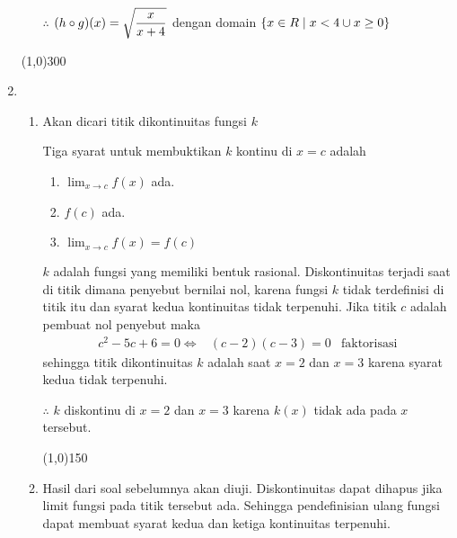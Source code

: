 \begin{enumerate}[leftmargin=*, label={\arabic*}.]
\begin{enumerate}[label={\alph*}.]
    $\therefore$ $\ds (h \circ g)(x) = \sqrt{\frac{x}{x+4}}$ dengan domain 
    $\set*{x \in R \mid x < 4 \cup x \geq 0}$ 
    
    \end{enumerate}

\begin{center}\line(1,0){300}\end{center}


\item
    \begin{enumerate}[label={\alph*}.]
    \item Akan dicari titik dikontinuitas fungsi $k$
    
    Tiga syarat untuk membuktikan $k$ kontinu di $x=c$ adalah
        \begin{enumerate}[label={\arabic*}.]
        \item $\lim_{x\to c} f(x)$ ada.
        \item $f(c)$ ada.
        \item $\lim_{x\to c} f(x) = f(c)$
        \end{enumerate}
    $k$ adalah fungsi yang memiliki bentuk rasional. Diskontinuitas terjadi saat 
    di titik dimana penyebut bernilai nol, karena fungsi $k$ tidak terdefinisi 
    di titik itu dan syarat kedua kontinuitas tidak terpenuhi.
    Jika titik $c$ adalah pembuat nol penyebut maka
    \begin{align*}
        c^{2} - 5c + 6 = 0
        \iff &(c-2)(c-3) = 0
        &\text{faktorisasi}
    \end{align*}
    sehingga titik dikontinuitas $k$ adalah saat $x=2$ dan $x=3$ karena syarat kedua 
    tidak terpenuhi.

    $\therefore$ $k$ diskontinu di $x=2$ dan $x=3$ karena $k(x)$ tidak ada pada 
    $x$ tersebut.


\begin{center}\line(1,0){150}\end{center}


    \item Hasil dari soal sebelumnya akan diuji. Diskontinuitas dapat dihapus jika limit 
    fungsi pada titik tersebut ada. Sehingga pendefinisian ulang fungsi dapat membuat 
    syarat kedua dan ketiga kontinuitas terpenuhi.


\end{enumerate}
\end{enumerate}
